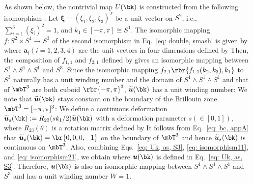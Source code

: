 \documentclass[
floatfix,
pra,
twocolumn,
reprint,
amsmath,amssymb,
aps,
footnote,
]{revtex4}
\begin{document}
As shown below,
the nontrivial map $U(\bk)$ is constructed from the following isomorphism \cite{Nakahara03}:
Let $\bm{\xi} = (\xi_1, \xi_2, \xi_3)^T$ be a unit vector on $S^2$, i.e., $\sum_{i=1}^3 (\xi_i)^2 = 1$, and $k_1 \in [-\pi, \pi] \cong S^1$.
The isomorphic mapping $f\colon S^2 \times S^1 \to S^3$ of the second isomorphism in Eq.~\eqref{eq: double, smash} is given by
where $\bm{a}_i (i=1,2,3,4)$ are the unit vectors in four dimensions defined by
Then, the composition of $f_{1,1}$ and $f_{2,1}$ defined by
gives an isomorphic mapping between $S^1 \wedge S^1 \wedge S^1$ and $S^3$.
Since the isomorphic mapping $f_{2,1}\rbr{f_{1,1}(k_2, k_3), k_1}$ to $S^3$ naturally has a unit winding number and the domain of $S^1 \wedge S^1 \wedge S^1$ and that of $\mbT^3$ are both cuboid $\rbr{-\pi, \pi}^3$,
$\widetilde{\bm{u}}(\bk)$ has a unit winding number:
We note that $\widetilde{\bm{u}}(\bk)$ stays constant on the boundary of the Brillouin zone $\mbT^3 = [-\pi,\pi]^3$:
We define a continuous deformation $\widetilde{\bm{u}}_s(\bk) := R_{23}(s k_1 / 2) \widetilde{\bm{u}}(\bk)$ with a deformation parameter $s (\in [0,1])$, where $R_{23}(\theta)$ is a rotation matrix defined by
It follows from Eq.~\eqref{eq: bc, appA} that
$\widetilde{\bm{u}}_s(\bk) = \br{0,0,0,-1}$ on the boundary of $\mbT^3$
and hence $\widetilde{\bm{u}}_s(\bk)$ is continuous on $\mbT^3$.
Also, combining Eqs.~\eqref{eq: Uk, as, S3}, \eqref{eq: isomorphism11}, and \eqref{eq: isomorphism21}, we obtain
where $\bm{u}(\bk)$ is defined in Eq.~\eqref{eq: Uk, as, S3}.
Therefore, $\bm{u}(\bk)$ is also an isomorphic mapping between $S^1 \wedge S^1 \wedge S^1$ and $S^3$ and has a unit winding number $W=1$.
\end{document}
